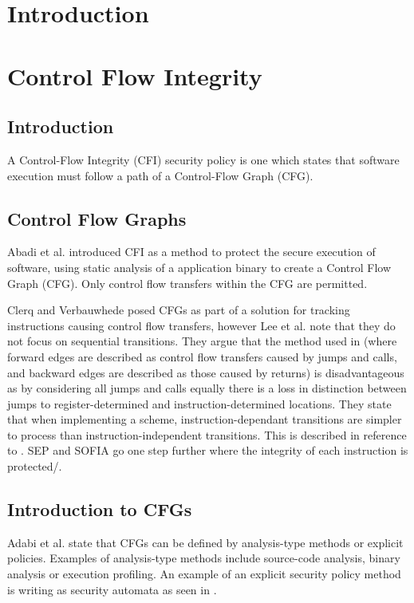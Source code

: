 \section{Introduction}
\section{Control Flow Integrity}
\subsection{Introduction}
A Control-Flow Integrity (CFI) security policy is one which states that software execution must follow a path of a Control-Flow Graph (CFG).
\subsection{Control Flow Graphs}
Abadi et al. \cite{Abadi2005} introduced CFI as a method to protect the secure execution of software, using static analysis of a application binary to create a Control Flow Graph (CFG). Only control flow transfers within the CFG are permitted.

Clerq and Verbauwhede \cite{DeClercq2017} posed CFGs as part of a solution for tracking instructions causing control flow transfers, however Lee et al. \cite{Lee2019} note that they do not focus on sequential transitions. They argue that the method used in \cite{DeClercq2017} (where forward edges are described as control flow transfers caused by jumps and calls, and backward edges are described as those caused by returns) is disadvantageous as by considering all jumps and calls equally there is a loss in distinction between jumps to register-determined and instruction-determined locations. They state that when implementing a scheme, instruction-dependant transitions are simpler to process than instruction-independent transitions. This is described in reference to \cite{Lee2016}. SEP \cite{Lee2019} and SOFIA \cite{DeClercq2017b} go one step further where the integrity of each instruction is protected/.
\ifnotesincluded
{}
\fi

\subsection{Introduction to CFGs}
Adabi et al. \cite{Abadi2005} state that CFGs can be defined by analysis-type methods or explicit policies. Examples of analysis-type methods include source-code analysis, binary analysis or execution profiling. An example of an explicit security policy method is writing as security automata as seen in \cite{Erlingsson2004}. 


